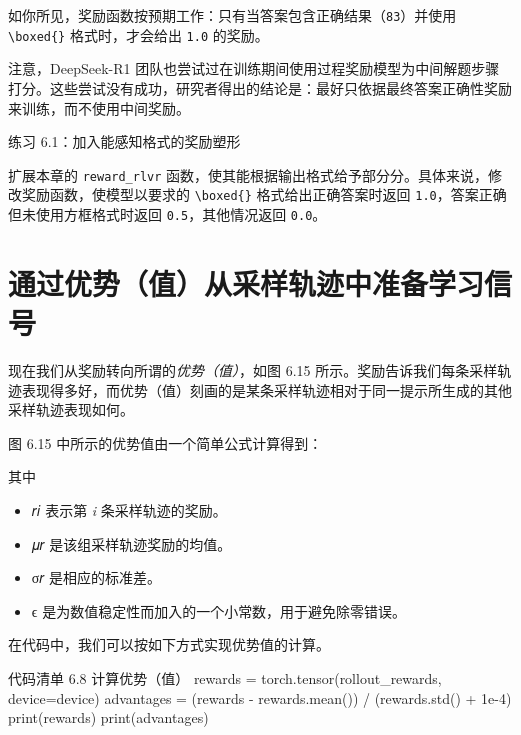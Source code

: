 如你所见，奖励函数按预期工作：只有当答案包含正确结果（\texttt{83}）并使用 \texttt{\textbackslash boxed\{\}} 格式时，才会给出 \texttt{1.0} 的奖励。

注意，DeepSeek-R1 团队也尝试过在训练期间使用过程奖励模型为中间解题步骤打分。这些尝试没有成功，研究者得出的结论是：最好只依据最终答案正确性奖励来训练，而不使用中间奖励。

\begin{mySidebar}{练习 6.1：加入能感知格式的奖励塑形}

扩展本章的 \texttt{reward\_rlvr} 函数，使其能根据输出格式给予部分分。具体来说，修改奖励函数，使模型以要求的 \texttt{\textbackslash boxed\{\}} 格式给出正确答案时返回 \texttt{1.0}，答案正确但未使用方框格式时返回 \texttt{0.5}，其他情况返回 \texttt{0.0}。

\end{mySidebar}

\section{通过优势（值）从采样轨迹中准备学习信号}

现在我们从奖励转向所谓的\emph{优势（值）}，如图 6.15 所示。奖励告诉我们每条采样轨迹表现得多好，而优势（值）刻画的是某条采样轨迹相对于同一提示所生成的其他采样轨迹表现如何。


图 6.15 中所示的优势值由一个简单公式计算得到：


其中

\begin{itemize}
\item 𝑟𝑖 表示第 \emph{i} 条采样轨迹的奖励。
\item 𝜇𝑟 是该组采样轨迹奖励的均值。
\item σ𝑟 是相应的标准差。
\item ϵ 是为数值稳定性而加入的一个小常数，用于避免除零错误。
\end{itemize}

在代码中，我们可以按如下方式实现优势值的计算。

\begin{codeboxt}{代码清单 6.8 计算优势（值）}
rewards = torch.tensor(rollout_rewards, device=device)
advantages = (rewards - rewards.mean()) / (rewards.std() + 1e-4)
print(rewards)
print(advantages)
\end{codeboxt}

